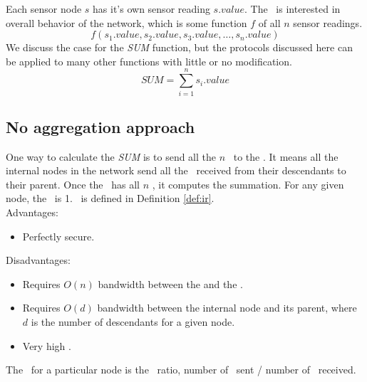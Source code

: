 	Each sensor node $s$ has it's own sensor reading $s.value$. The \bs\ is interested in overall behavior of the network, which is some function $f$ of all $n$ sensor readings.
	\begin{equation}
		f(s_{1}.value, s_{2}.value, s_{3}.value, \dotsc, s_{n}.value)
	\end{equation}
	We discuss the case for the \textit{SUM} function, but the protocols discussed here can be applied to many other functions with little or no modification. 
	\begin{equation}
		\textit{SUM} = \sum\limits_{i=1}^n s_{i}.value
	\end{equation}

	\subsection{No aggregation approach}
		One way to calculate the \textit{SUM} is to send all the $n$ \payloads\ to the \bs.
		It means all the internal nodes in the network send all the \payloads\ received from their descendants to their parent.
		Once the \bs\ has all $n$ \payloads, it computes the summation.
		For any given node, the \inforate\ is 1. \inforate\ is defined in Definition \ref{def:ir}.\\
		Advantages:
		\begin{itemize}
			\item Perfectly secure.
		\end{itemize}
		Disadvantages:
		\begin{itemize}
			\item Requires $O(n)$ bandwidth between the \bs and the \bs.
			\item Requires $O(d)$ bandwidth between the internal node and its parent, where $d$ is the number of descendants for a given node.
			\item Very high \inforate.
		\end{itemize}
			
	\begin{definition}\label{def:ir}
		The \inforate\ for a particular node is the \payloads\ ratio, number of \payloads\ sent / number of \payloads\ received.
	\end{definition}

